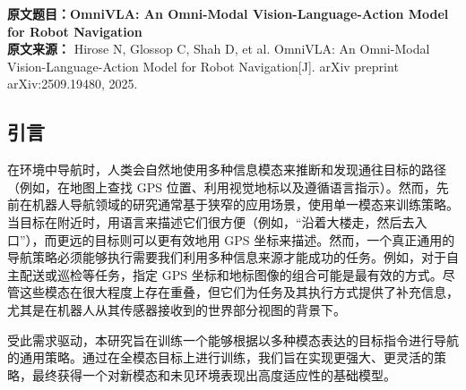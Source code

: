 {
\noindent \textbf{原文题目：OmniVLA: An Omni-Modal Vision-Language-Action Model for Robot Navigation} \\
\textbf{原文来源：} Hirose N, Glossop C, Shah D, et al. OmniVLA: An Omni-Modal Vision-Language-Action Model for Robot Navigation[J]. arXiv preprint arXiv:2509.19480, 2025. \\
}

\vskip 5mm

 {
\setlength{\baselineskip}{16pt}}

\subsection{引言}

在环境中导航时，人类会自然地使用多种信息模态来推断和发现通往目标的路径（例如，在地图上查找 GPS 位置、利用视觉地标以及遵循语言指示）。然而，先前在机器人导航领域的研究通常基于狭窄的应用场景，使用单一模态来训练策略。当目标在附近时，用语言来描述它们很方便（例如，“沿着大楼走，然后去入口”），而更远的目标则可以更有效地用 GPS 坐标来描述。然而，一个真正通用的导航策略必须能够执行需要我们利用多种信息来源才能成功的任务。例如，对于自主配送或巡检等任务，指定 GPS 坐标和地标图像的组合可能是最有效的方式。尽管这些模态在很大程度上存在重叠，但它们为任务及其执行方式提供了补充信息，尤其是在机器人从其传感器接收到的世界部分视图的背景下。

受此需求驱动，本研究旨在训练一个能够根据以多种模态表达的目标指令进行导航的通用策略。通过在全模态目标上进行训练，我们旨在实现更强大、更灵活的策略，最终获得一个对新模态和未见环境表现出高度适应性的基础模型。

